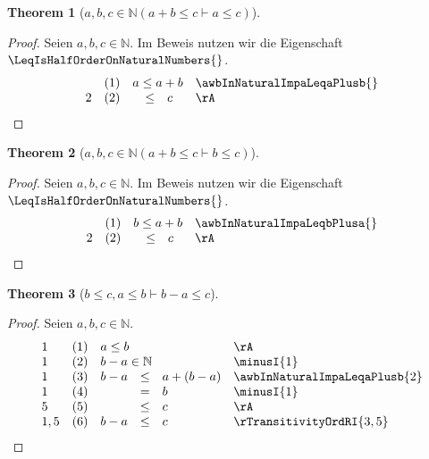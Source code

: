 \documentclass{book}
\theoremstyle{plain}
\newtheorem{theorem}{Theorem}
\theoremstyle{remark}
\theoremstyle{definition}
\begin{document}
\label{awbwcInNaturalLpaPlusbLeqcImpaLeqcRp}
\begin{theorem}[\(a,b,c\in\mathbb{N}(a+b\leq c\vdash a\leq c)\)]
\end{theorem}
\begin{proof}
Seien \(a, b, c \in \mathbb{N}\). Im Beweis nutzen wir die Eigenschaft \(\LeqIsHalfOrderOnNaturalNumbers{}\).
        \[
	\begin{array}{llclll}
                  &  (1) & \multicolumn{3}{l}{a\leq a+b} & \awbInNaturalImpaLeqaPlusb{} \\
            2     &  (2) &  &\leq& c & \rA \\
        \end{array}
	\]
\end{proof}



\label{awbwcInNaturalLpaPlusbLeqcImpbLeqcRp}
\begin{theorem}[\(a,b,c\in\mathbb{N}(a+b\leq c\vdash b\leq c)\)]
\end{theorem}
\begin{proof}
Seien \(a, b, c \in \mathbb{N}\). Im Beweis nutzen wir die Eigenschaft \(\LeqIsHalfOrderOnNaturalNumbers{}\).
        \[
	\begin{array}{llclll}
                  &  (1) & \multicolumn{3}{l}{b\leq a+b} & \awbInNaturalImpaLeqbPlusa{} \\
            2     &  (2) &  &\leq& c & \rA \\
        \end{array}
	\]
\end{proof}

\label{bLeqcwaLeqbImpbMinuscLeqc}
\begin{theorem}[\(b\leq c, a\leq b\vdash b-a\leq c\)]
\end{theorem}
\begin{proof}
Seien \(a, b, c \in \mathbb{N}\). 
\[
\begin{array}{llclll}
          1  & (1) & \multicolumn{3}{l}{a\leq b}  & \rA \\
          1  & (2) & \multicolumn{3}{l}{b-a\in\mathbb{N}}  & \minusI{1} \\
          1  & (3) & b-a&\leq& a+(b-a)  & \awbInNaturalImpaLeqaPlusb{2} \\
          1  & (4) & &=& b  & \minusI{1} \\
          5  & (5) & &\leq & c  & \rA \\
          1,5& (6) & b-a&\leq & c  & \rTransitivityOrdRI{3,5} \\
\end{array}
\]
\end{proof}
\end{document}
